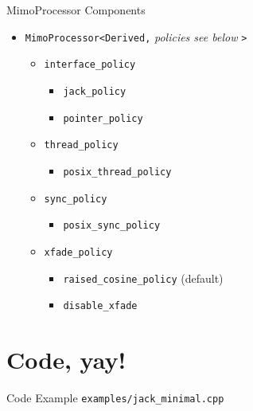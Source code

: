 \documentclass{beamer}
\newcommand{\code}{\texttt}
\begin{document}
\begin{frame}{MimoProcessor Components}
\begin{itemize}
\item \code{MimoProcessor<Derived,} \emph{policies see below} \code{>}
\pause
\begin{itemize}
\item \code{interface\_policy}
\begin{itemize}
\item \code{jack\_policy}
\item \code{pointer\_policy}
\end{itemize}
\pause
\item \code{thread\_policy}
\begin{itemize}
\item \code{posix\_thread\_policy}
\end{itemize}
\pause
\item \code{sync\_policy}
\begin{itemize}
\item \code{posix\_sync\_policy}
\end{itemize}
\pause
\item \code{xfade\_policy}
\begin{itemize}
\item \code{raised\_cosine\_policy} (default)
\item \code{disable\_xfade}
\end{itemize}
\end{itemize}
\end{itemize}
\end{frame}

\section{Code, yay!}

\lstset{language=[ISO]C++}
\lstset{basicstyle=\scriptsize\ttfamily} 
\lstset{basewidth=0.54em}

\begin{frame}[fragile=singleslide]{Code Example}
{\code{examples/jack\_minimal.cpp}}

\end{frame}

\begin{frame}[fragile=singleslide,t]

\end{frame}
\end{document}
